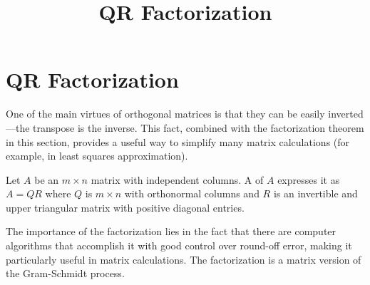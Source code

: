 \documentclass{ximera}
\title{QR Factorization} \license{CC BY-NC-SA 4.0}
\begin{document}
\begin{abstract}

\end{abstract}
\maketitle

\section*{QR Factorization}
One of the main virtues of orthogonal
matrices is that they can be easily inverted---the transpose is the
inverse. This fact, combined with the factorization theorem in this
section, provides a useful way to simplify many matrix calculations (for
 example, in least squares approximation).


\begin{definition}\label{def:QR-factorization}
Let $A$ be an $m \times n$ matrix with independent columns. A  of $A$ expresses it as $A = QR$ where $Q$ is $m \times n$ with orthonormal columns and $R$ is an invertible and upper triangular matrix with positive diagonal entries.
\end{definition}

The importance of the factorization
lies in the fact that there are computer algorithms that accomplish it
with good control over round-off error, making it particularly useful in
 matrix calculations. The factorization is a matrix version of the Gram-Schmidt process.
\end{document}
